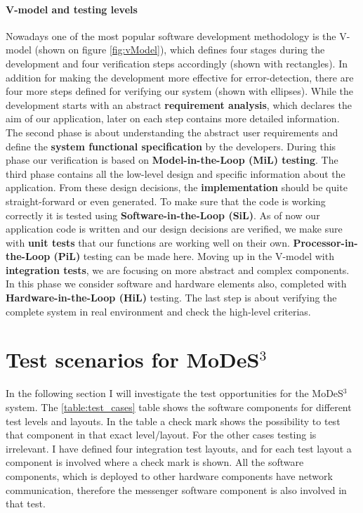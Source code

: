 \paragraph{V-model and testing levels}
Nowadays one of the most popular software development methodology is the V-model \cite{Vmodel} (shown on figure \ref{fig:vModel}), which defines four stages during the development and four verification steps accordingly (shown with rectangles). In addition for making the development more effective for error-detection, there are four more steps defined for verifying our system \cite{TestLevels} (shown with ellipses). While the development starts with an abstract \textbf{requirement analysis}, which declares the aim of our application, later on each step contains more detailed information. The second phase is about understanding the abstract user requirements and define the \textbf{system functional specification} by the developers. During this phase our verification is based on \textbf{Model-in-the-Loop (MiL) testing}. The third phase contains all the low-level design and specific information about the application. From these design decisions, the \textbf{implementation} should be quite straight-forward or even generated. To make sure that the code is working correctly it is tested using \textbf{Software-in-the-Loop (SiL)}. 
As of now our application code is written and our design decisions are verified, we make sure with \textbf{unit tests} that our functions are working well on their own. \textbf{Processor-in-the-Loop (PiL)} testing can be made here. Moving up in the V-model with \textbf{integration tests}, we are focusing on more abstract and complex components. In this phase we consider software and hardware elements also, completed with \textbf{Hardware-in-the-Loop (HiL)} testing. The last step is about verifying the complete system in real environment and check the high-level criterias.


\section{Test scenarios for MoDeS$^3$}
In the following section I will investigate the test opportunities for the MoDeS$^3$ system.  The \ref{table:test_cases} table shows the software components for different test levels and layouts. In the table a check mark shows the possibility to test that component in that exact level/layout. For the other cases testing is irrelevant. I have defined four integration test layouts, and for each test layout a component is involved where a check mark is shown. All the software components, which is deployed to other hardware components have network communication, therefore the messenger software component is also involved in that test.

